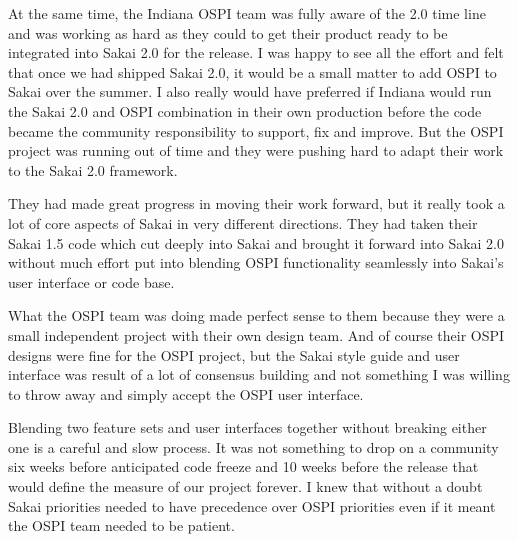 \documentclass[12pt]{book}
\begin{document}
At the same time, the Indiana OSPI team was
fully aware of the 2.0 time line and was
working as hard as they could to get their
product ready to be integrated into Sakai 2.0
for the release.  I was happy to see all
the effort and felt that once we had shipped
Sakai 2.0, it would be a small matter to add OSPI
to Sakai over the summer.  I also really
would have preferred if Indiana would run the
Sakai 2.0 and OSPI combination in their own
production before the code became the community
responsibility to support, fix and improve.
But the OSPI project was running out of time
and they were pushing hard to adapt
their work to the Sakai 2.0 framework.

They had made great progress in moving their work
forward, but it really took a lot
of core aspects of Sakai in very different
directions.  They had taken their Sakai 1.5 code
which cut deeply into Sakai and brought
it forward into Sakai 2.0 without much effort
put into blending OSPI functionality seamlessly
into Sakai's user interface or code base.

What the OSPI team was doing made perfect sense
to them because they were a small independent
project with their own design team.
And of course their OSPI designs
were fine for the OSPI project, but the Sakai
style guide and
user interface was result of a lot of consensus
building and not something I was willing to
throw away and simply accept the OSPI user
interface.

Blending two feature sets and user interfaces
together without breaking either one is a careful
and slow process.  It was not something to drop on
a community six weeks before anticipated code freeze
and 10 weeks before the release that would define
the measure of our project forever.  I knew that
without a doubt Sakai priorities needed
to have precedence over OSPI priorities even if it
meant the OSPI team needed to be patient.
\end{document}
